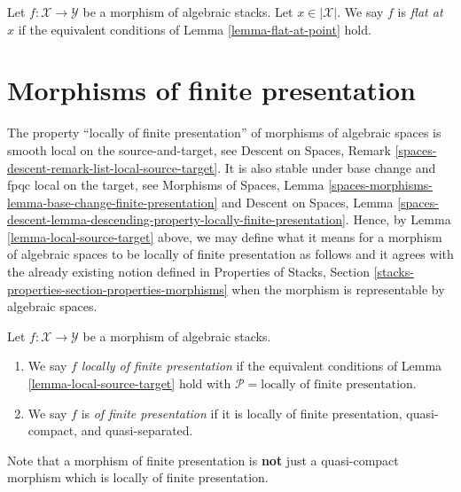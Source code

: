 \begin{definition}
\label{definition-flat-at-point}
Let $f : \mathcal{X} \to \mathcal{Y}$ be a morphism of algebraic stacks.
Let $x \in |\mathcal{X}|$. We say $f$ is {\it flat at $x$} if the
equivalent conditions of Lemma \ref{lemma-flat-at-point} hold.
\end{definition}





\section{Morphisms of finite presentation}
\label{section-finite-presentation}

\noindent
The property ``locally of finite presentation'' of morphisms of algebraic
spaces is smooth local on the source-and-target, see
Descent on Spaces, Remark \ref{spaces-descent-remark-list-local-source-target}.
It is also stable under base change and fpqc local on the target, see
Morphisms of Spaces,
Lemma \ref{spaces-morphisms-lemma-base-change-finite-presentation}
and
Descent on Spaces, Lemma
\ref{spaces-descent-lemma-descending-property-locally-finite-presentation}.
Hence, by
Lemma \ref{lemma-local-source-target}
above, we may define what it means for a morphism of algebraic spaces
to be locally of finite presentation as follows and it agrees with the already
existing notion defined in
Properties of Stacks,
Section \ref{stacks-properties-section-properties-morphisms}
when the morphism is representable by algebraic spaces.

\begin{definition}
\label{definition-locally-finite-presentation}
Let $f : \mathcal{X} \to \mathcal{Y}$ be a morphism of algebraic stacks.
\begin{enumerate}
\item We say $f$
{\it locally of finite presentation} if the equivalent conditions of
Lemma \ref{lemma-local-source-target}
hold with
$\mathcal{P} = \text{locally of finite presentation}$.
\item We say $f$ is
{\it of finite presentation} if it is locally of finite presentation,
quasi-compact, and quasi-separated.
\end{enumerate}
\end{definition}

\noindent
Note that a morphism of finite presentation is {\bf not} just a quasi-compact
morphism which is locally of finite presentation.

